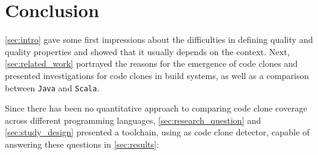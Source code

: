 
\section{Conclusion}
\label{sec:conclusion}

\autoref{sec:intro} gave some first impressions about the difficulties in defining quality and quality properties and showed that it usually depends on the context. Next, \autoref{sec:related_work} portrayed the reasons for the emergence of code clones and presented investigations for code clones in build systems, as well as a comparison between \texttt{Java} and \texttt{Scala}.

Since there has been no quantitative approach to comparing code clone coverage across different programming languages, \autoref{sec:research_question} and \autoref{sec:study_design} presented a toolchain, using \teamscale{} as code clone detector, capable of answering these questions in \autoref{sec:results}:


